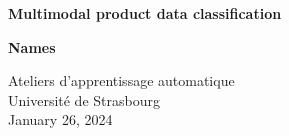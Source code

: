 
	\begin{titlepage}
		\centering
		\vspace*{1cm}
		\Huge
		\textbf{Multimodal product data classification}
		
		\vspace{0.5cm}
		\LARGE
		
		\vspace{1.5cm}
		
		\textbf{Names}
		
		\vfill
		
		
		\vspace{0.8cm}
		
		\Large
		Ateliers d'apprentissage automatique\\
		Université de Strasbourg\\
		January 26, 2024
	\end{titlepage}
